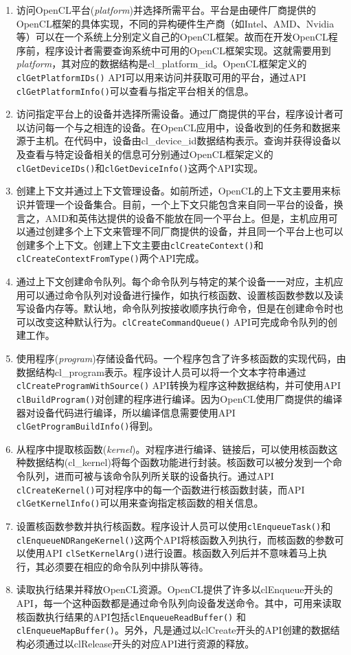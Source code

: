 \begin{enumerate}
  \item 访问OpenCL平台(\emph{platform})并选择所需平台。平台是由硬件厂商提供的OpenCL框架的具体实现，不同的异构硬件生产商（如Intel、AMD、Nvidia等）可以在一个系统上分别定义自己的OpenCL框架。故而在开发OpenCL程序前，程序设计者需要查询系统中可用的OpenCL框架实现。这就需要用到\emph{platform}，其对应的数据结构是cl\_platform\_id。OpenCL框架定义的\texttt{clGetPlatformIDs()} API可以用来访问并获取可用的平台，通过API \texttt{clGetPlatformInfo()}可以查看与指定平台相关的信息。
  \item 访问指定平台上的设备并选择所需设备。通过厂商提供的平台，程序设计者可以访问每一个与之相连的设备。在OpenCL应用中，设备收到的任务和数据来源于主机。在代码中，设备由cl\_device\_id数据结构表示。查询并获得设备以及查看与特定设备相关的信息可分别通过OpenCL框架定义的\texttt{clGetDeviceIDs()}和\texttt{clGetDeviceInfo()}这两个API实现。
  \item 创建上下文并通过上下文管理设备。如前所述，OpenCL的上下文主要用来标识并管理一个设备集合。目前，一个上下文只能包含来自同一平台的设备，换言之，AMD和英伟达提供的设备不能放在同一个平台上。但是，主机应用可以通过创建多个上下文来管理不同厂商提供的设备，并且同一个平台上也可以创建多个上下文。创建上下文主要由\texttt{clCreateContext()}和\texttt{clCreateContextFromType()}两个API完成。
  \item 通过上下文创建命令队列。每个命令队列与特定的某个设备一一对应，主机应用可以通过命令队列对设备进行操作，如执行核函数、设置核函数参数以及读写设备内存等。默认地，命令队列按接收顺序执行命令，但是在创建命令时也可以改变这种默认行为。\texttt{clCreateCommandQueue()} API可完成命令队列的创建工作。
  \item 使用程序(\emph{program})存储设备代码。一个程序包含了许多核函数的实现代码，由数据结构cl\_program表示。程序设计人员可以将一个文本字符串通过 \texttt{clCreateProgramWithSource()} API转换为程序这种数据结构，并可使用API \texttt{clBuildProgram()}对创建的程序进行编译。因为OpenCL使用厂商提供的编译器对设备代码进行编译，所以编译信息需要使用API \texttt{clGetProgramBuildInfo()}得到。
  \item 从程序中提取核函数(\emph{kernel})。对程序进行编译、链接后，可以使用核函数这种数据结构(cl\_kernel)将每个函数功能进行封装。核函数可以被分发到一个命令队列，进而可被与该命令队列所关联的设备执行。通过API \texttt{clCreateKernel()}可对程序中的每一个函数进行核函数封装，而API \texttt{clGetKernelInfo()}可以用来查询指定核函数的相关信息。
  \item 设置核函数参数并执行核函数。程序设计人员可以使用\texttt{clEnqueueTask()}和\texttt{clEnqueueNDRangeKernel()}这两个API将核函数入列执行，而核函数的参数可以使用API \texttt{clSetKernelArg()}进行设置。核函数入列后并不意味着马上执行，其必须要在相应的命令队列中排队等待。
  \item 读取执行结果并释放OpenCL资源。OpenCL提供了许多以clEnqueue开头的API，每一个这种函数都是通过命令队列向设备发送命令。其中，可用来读取核函数执行结果的API包括\texttt{clEnqueueReadBuffer()} 和\texttt{clEnqueueMapBuffer()}。另外，凡是通过以clCreate开头的API创建的数据结构必须通过以clRelease开头的对应API进行资源的释放。
\end{enumerate}

